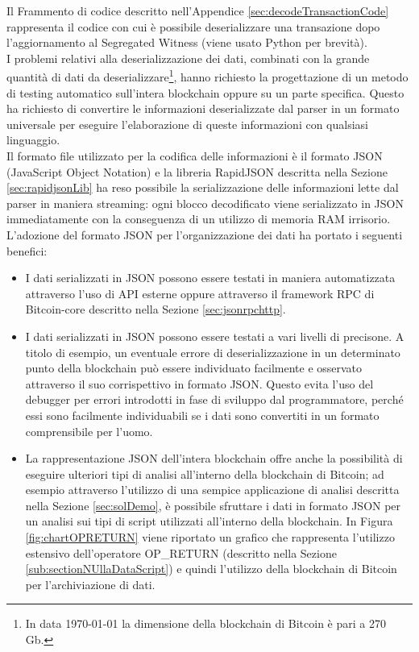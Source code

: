 Il Frammento di codice descritto nell'Appendice \ref{sec:decodeTransactionCode} rappresenta il codice con cui è possibile deserializzare una transazione dopo l'aggiornamento al Segregated Witness (viene usato Python per brevità).\\
I problemi relativi alla deserializzazione dei dati, combinati con la grande quantità di dati da deserializzare\footnote{In data {\today} la dimensione della blockchain di Bitcoin è pari a 270 Gb.}, hanno richiesto la progettazione di un metodo di testing automatico sull'intera blockchain oppure su un parte specifica.
Questo ha richiesto di convertire le informazioni deserializzate dal parser in un formato universale per eseguire l'elaborazione di queste informazioni con qualsiasi linguaggio.\\
Il formato file utilizzato per la codifica delle informazioni è il formato JSON (JavaScript Object Notation) e la libreria RapidJSON descritta nella Sezione \ref{sec:rapidjsonLib} ha reso possibile la serializzazione delle informazioni lette dal parser in maniera streaming: ogni blocco decodificato viene serializzato in JSON immediatamente con la conseguenza di un utilizzo di memoria RAM irrisorio.\\
L'adozione del formato JSON per l'organizzazione dei dati ha portato i seguenti benefici:
\begin{itemize}
  \item I dati serializzati in JSON possono essere testati in maniera automatizzata attraverso l'uso di API esterne oppure attraverso il framework RPC di Bitcoin-core descritto nella Sezione \ref{sec:jsonrpchttp}.
  \item I dati serializzati in JSON possono essere testati a vari livelli di precisone. A titolo di esempio, un eventuale errore di deserializzazione in un determinato punto della blockchain può essere individuato facilmente e osservato attraverso il suo corrispettivo in formato JSON.
  Questo evita l'uso del debugger per errori introdotti in fase di sviluppo dal programmatore, perché essi sono facilmente individuabili se i dati sono convertiti in un formato comprensibile per l'uomo.
  \item La rappresentazione JSON dell'intera blockchain offre anche la possibilità di eseguire ulteriori tipi di analisi all'interno della blockchain di Bitcoin; ad esempio attraverso l'utilizzo di una sempice applicazione di analisi descritta nella Sezione \ref{sec:solDemo}, è possibile sfruttare i dati in formato JSON per un analisi sui tipi di script utilizzati all'interno della blockchain.
  In Figura \ref{fig:chartOPRETURN} viene riportato un grafico che rappresenta l'utilizzo estensivo dell'operatore OP\_RETURN (descritto nella Sezione \ref{sub:sectionNUllaDataScript}) e quindi l'utilizzo della blockchain di Bitcoin per l'archiviazione di dati.
\end{itemize}

